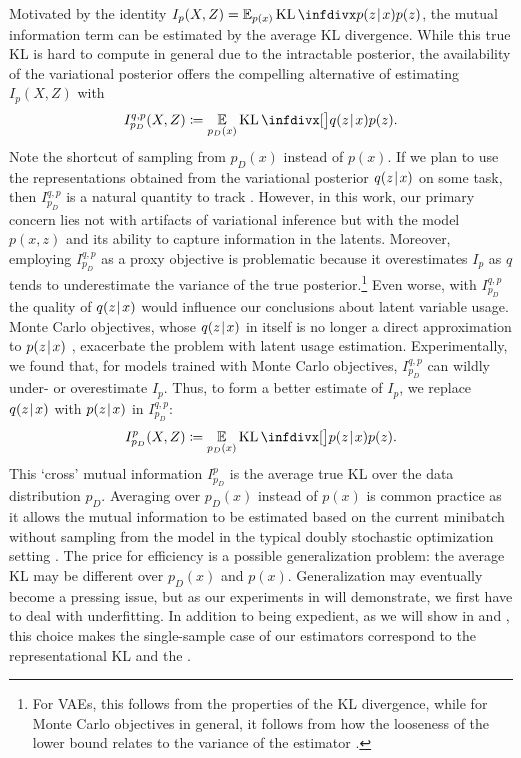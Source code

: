 Motivated by the identity $I_p(X,Z)=\E_{p(x)} \KL\Div{p(z\tmid x)}{p(z)}$, the mutual information term can be estimated by the average KL divergence.
While this true KL is hard to compute in general due to the intractable posterior, the availability of the variational posterior offers the compelling alternative of estimating $I_p(X,Z)$ with
\begin{align*}
I^{q,p}_{p_D}(X,Z) \coloneqq \E_{p_D(x)} \KL\Div[\big]{q(z\tmid x)}{p(z)}.
\end{align*}
Note the shortcut of sampling from $p_D(x)$ instead of $p(x)$.
If we plan to use the representations obtained from the variational posterior $q(z\hspace{0.08em}|\hspace{0.11em} x)$ on some task, then $I^{q,p}_{p_D}$ is a natural quantity to track \citep{zhao2019infovae,rezaabad2020learning}.
However, in this work, our primary concern lies not with artifacts of variational inference but with the model $p(x,z)$ and its ability to capture information in the latents.
Moreover, employing $I^{q,p}_{p_D}$ as a proxy objective is problematic because it overestimates $I_p$ as $q$ tends to underestimate the variance of the true posterior.\footnote{For VAEs, this follows from the properties of the KL divergence, while for Monte Carlo objectives in general, it follows from how the looseness of the lower bound relates to the variance of the estimator \citep{maddison2017filtering}.}
Even worse, with $I^{q,p}_{p_D}$ the quality of $q(z\hspace{0.08em}|\hspace{0.11em} x)$ would influence our conclusions about latent variable usage.
Monte Carlo objectives, whose $q(z\hspace{0.08em}|\hspace{0.11em} x)$ in itself is no longer a direct approximation to $p(z\hspace{0.08em}|\hspace{0.11em} x)$ \citep{mnih2016variational}, exacerbate the problem with latent usage estimation.
Experimentally, we found that, for models trained with Monte Carlo objectives, $I^{q,p}_{p_D}$ can wildly under- or overestimate $I_p$.
Thus, to form a better estimate of $I_p$, we replace $q(z\hspace{0.08em}|\hspace{0.11em} x)$ with $p(z\hspace{0.08em}|\hspace{0.11em} x)$ in $I^{q,p}_{p_D}$:
\begin{align}
\label{eq:cross-mi}
I_{p_D}^p(X,Z) \coloneqq \E_{p_D(x)} \KL\Div[\big]{p(z\tmid x)}{p(z)}.
\end{align}
This `cross' mutual information $I_{p_D}^p$ is the average true KL over the data distribution $p_D$.
Averaging over $p_D(x)$ instead of $p(x)$ is common practice as it allows the mutual information to be estimated based on the current minibatch without sampling from the model in the typical doubly stochastic optimization setting \citep{titsias2014doubly}.
The price for efficiency is a possible generalization problem: the average KL may be different over $p_D(x)$ and $p(x)$.
Generalization may eventually become a pressing issue, but as our experiments in  will demonstrate, we first have to deal with underfitting.
In addition to being expedient, as we will show in  and , this choice makes the single-sample case of our estimators correspond to the representational KL and the \betavae{} \citep{higgins2016beta}.

